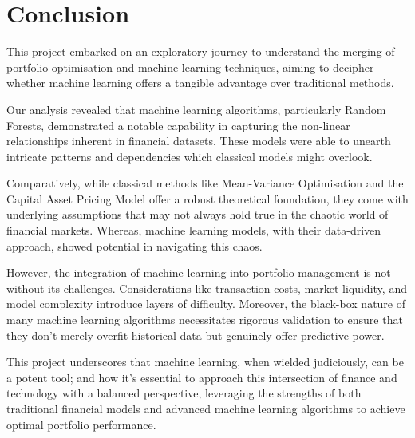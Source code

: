 \documentclass[a4paper,12pt,titlepage]{article}
\numberwithin{equation}{section}
\begin{document}
\section{Conclusion}

This project embarked on an exploratory journey to understand the merging of portfolio optimisation and machine 
learning techniques, aiming to decipher whether machine learning offers a tangible advantage over traditional methods.
\newline \par \noindent Our analysis revealed that machine learning algorithms, particularly Random Forests, demonstrated 
a notable capability in capturing the non-linear relationships inherent in financial datasets. These models were able to 
unearth intricate patterns and dependencies which classical models might overlook. \newline \par \noindent Comparatively, 
while classical methods like Mean-Variance Optimisation and the Capital Asset Pricing Model 
offer a robust theoretical foundation, they come with underlying assumptions that may not always hold true in the 
chaotic world of financial markets. Whereas, machine learning models, 
with their data-driven approach, showed potential in navigating this chaos. \newline \par \noindent However, the integration 
of machine learning into portfolio management is not without its challenges. Considerations like transaction costs, market 
liquidity, and model complexity introduce layers of difficulty. Moreover, the black-box nature of many machine learning 
algorithms necessitates rigorous validation to ensure that they don't merely overfit historical data but genuinely offer 
predictive power. \newline \par \noindent This project underscores that machine learning, when wielded judiciously, can 
be a potent tool; and how it’s essential to approach this intersection of finance and technology with a balanced perspective, 
leveraging the strengths of both traditional financial models and advanced machine learning algorithms to achieve optimal 
portfolio performance.

\newpage

\nocite{*}

\end{document}
